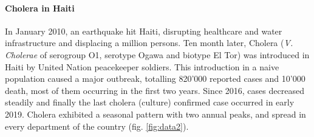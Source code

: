 \paragraph{Cholera in Haiti} In January 2010, an earthquake hit Haiti, disrupting healthcare and water infrastructure and displacing a million persons. Ten month later, Cholera (\textit{V. Cholerae} of serogroup O1, serotype Ogawa and biotype El Tor) was introduced in Haiti by United Nation peacekeeper soldiers\cite[-3\baselineskip]{Frerichs:NepaleseOriginCholera:2012, Piarroux:UnderstandingCholeraEpidemic:2011}. 
This introduction in a naive population caused a major outbreak, totalling 820'000 reported cases and 10'000 death, most of them occurring in the first two years\cite[-1\baselineskip]{Barzilay:CholeraSurveillanceHaiti:2013}.  Since 2016, cases decreased steadily and finally the last cholera (culture) confirmed case occurred in early 2019\cite{Mitchell:PAHOWHOHaiti:2020}. Cholera exhibited a seasonal pattern with two annual peaks, and spread in every department of the country (fig. \ref{fig:data2}).
